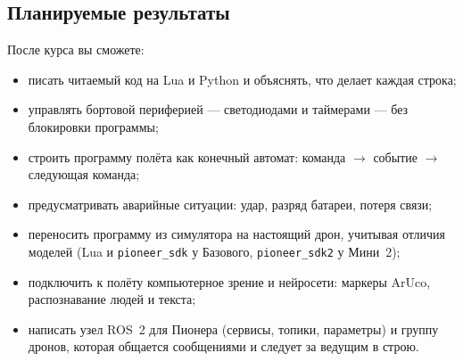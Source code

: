 \subsection*{Планируемые результаты}

После курса вы сможете:
\begin{itemize}
    \item писать читаемый код на Lua и Python и объяснять, что делает каждая строка;
    \item управлять бортовой периферией --- светодиодами и таймерами --- без блокировки программы;
    \item строить программу полёта как конечный автомат: команда $\to$ событие $\to$ следующая команда;
    \item предусматривать аварийные ситуации: удар, разряд батареи, потеря связи;
    \item переносить программу из симулятора на настоящий дрон, учитывая отличия моделей (Lua и \texttt{pioneer\_sdk} у Базового, \texttt{pioneer\_sdk2} у Мини~2);
    \item подключить к полёту компьютерное зрение и нейросети: маркеры ArUco, распознавание людей и текста;
    \item написать узел ROS~2 для Пионера (сервисы, топики, параметры) и группу дронов, которая общается сообщениями и следует за ведущим в строю.
\end{itemize}
